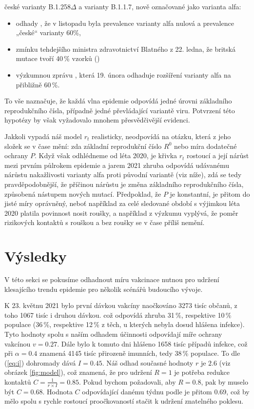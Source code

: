 české varianty B.1.258$\Delta$ a varianty B.1.1.7, nově označované jako varianta alfa:
\begin{itemize}
\item odhady \cite{brejova2021b}, že v listopadu byla
prevalence varianty alfa nulová a prevalence „české“ varianty 60\%, 
\item zmínku tehdejšího ministra zdravotnictví Blatného z 22. ledna, že britská mutace tvoří 40\,\% vzorků (\cite{blatnybrigit})
\item výzkumnou zprávu \cite{diana}, která 19. února odhaduje rozšíření varianty alfa
na přibližně 60\,\%.
\end{itemize}
To vše naznačuje, že každá vlna epidemie odpovídá jedné úrovni základního reprodukčního čísla, případně jedné převládající variantě viru. Potvrzení této hypotézy by však vyžadovalo
mnohem přesvědčivější evidenci.

Jakkoli vypadá náš model $r_t$ realisticky, neodpovídá na otázku, která z jeho složek se v čase mění: zda základní reprodukční číslo $R^0$ nebo míra dodatečné ochrany $P$. Když však odhlédneme od léta 2020, je křivka $r_t$ rostoucí a její nárůst mezi prvním půlrokem epidemie a jarem 2021 zhruba odpovídá udávanému nárůstu nakažlivosti varianty alfa proti původní variantě (viz níže), zdá se tedy pravděpodobnější, že příčinou nárůstu je změna základního reprodukčního čísla, způsobená nástupem nových mutací. Předpoklad, že $P$ je konstantní, je přitom do jisté míry 
oprávněný, neboť například za celé sledované období s výjimkou léta
2020 platila povinnost nosit roušky, a například z výzkumu \cite{paqcovid}
vyplývá, že poměr rizikových kontaktů s rouškou a bez roušky se v
čase příliš nemění. 

\section*{Výsledky}

V této sekci se pokusíme odhadnout míru vakcinace nutnou pro udržení
klesajícího trendu epidemie pro několik scénářů budoucího vývoje. 

K 23. květnu 2021 bylo první dávkou vakcíny naočkováno 3273 tisíc
občanů, z toho 1067 tisíc i druhou dávkou. což odpovídá zhruba 31\,\%,
respektive 10\,\% populace (36\,\%, respektive 12\,\% z těch, u kterých nebyla
dosud hlášena infekce). Tyto hodnoty spolu s naším odhadem účinnosti
odpovídají míře ochrany vakcínou $v=0.27$. Dále bylo k tomuto dni
hlášeno 1658 tisíc případů infekce, což při $\alpha=0.4$ znamená
4145 tisíc přirozeně imunních, tedy 38\,\% populace. To dle (\ref{eq:i})
dohromady dává $I=0.45$. Náš odhad současné hodnoty $r$ je $2.6$ (viz obrázek \ref{fig:model}), což znamená, že pro udržení $R=1$ je potřeba redukce kontaktů
$C=\frac{1}{r\times I}=0.85$. Pokud bychom požadovali, aby $R=0.8$,
pak by muselo být $C=0.68$. Hodnota $C$ odpovídající danému týdnu
podle \cite{paqcovid} je přitom 0.69, což by mělo spolu s
rychle rostoucí proočkovaností stačit k udržení znatelného poklesu.

